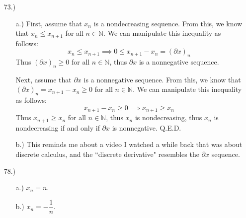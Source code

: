 \documentclass[12pt]{article}
\begin{document}
\begin{itemize}
    \item [73.)] \begin{itemize}
        \item [a.)] First, assume that $x_n$ is a nondecreasing sequence. From this, we know that $x_n\leq x_{n+1}$ for all $n\in\mathbb{N}$. We can manipulate this inequality as follows:
        \[x_n\leq x_{n+1}\implies 0\leq x_{n+1}-x_n=(\partial x)_n\]
        Thus $(\partial x)_n\geq0$ for all $n\in\mathbb{N}$, thus $\partial x$ is a nonnegative sequence.
        
        Next, assume that $\partial x$ is a nonnegative sequence. From this, we know that $(\partial x)_n=x_{n+1}-x_n\geq0$ for all $n\in\mathbb{N}$. We can manipulate this inequality as follows:
        \[x_{n+1}-x_n\geq0\implies x_{n+1}\geq x_n\]
        Thus $x_{n+1}\geq x_n$ for all $n\in\mathbb{N}$, thus $x_n$ is nondecreasing, thus $x_n$ is nondecreasing if and only if $\partial x$ is nonnegative. Q.E.D.

        \item [b.)] This reminds me about a video I watched a while back that was about discrete calculus, and the ``discrete derivative" resembles the $\partial x$ sequence.
    \end{itemize}





    \item [78.)] \begin{itemize}
        \item [a.)] $x_n=n$.

        \item [b.)] $x_n=-\dfrac{1}{n}$.
    \end{itemize}







\end{itemize}
\end{document}
